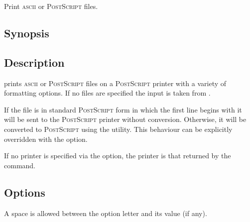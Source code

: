Print \textsc{ascii} or \textsc{PostScript} files.

\subsection*{Synopsis}

\begin{synopsis}
\end{synopsis}

\subsection*{Description}

 prints \textsc{ascii} or \textsc{PostScript} files on a
\textsc{PostScript} printer with a variety of formatting options.  If no files
are specified the input is taken from .

If the file is in standard \textsc{PostScript} form in which the first line
begins with \code{\%!} it will be sent to the \textsc{PostScript} printer
without conversion.  Otherwise, it will be converted to \textsc{PostScript}
using the  utility.  This behaviour can be explicitly
overridden with the  option.

If no printer is specified via the  option, the printer is that
returned by the  command.

\subsection*{Options}

A space is allowed between the option letter and its value (if any).

